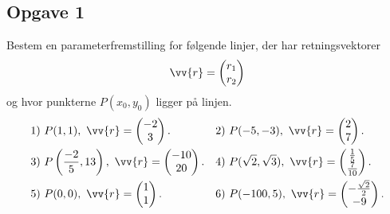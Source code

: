 \subsection*{Opgave 1}
Bestem en parameterfremstilling for følgende linjer, der har retningsvektorer $$\vv{r} = \begin{pmatrix}
r_1 \\ r_2
\end{pmatrix}$$ og hvor punkterne $P(x_0,y_0)$ ligger på linjen.
\begin{align*}
&1) \ P(1,1), \ \vv{r} = \begin{pmatrix}
-2 \\ 3
\end{pmatrix}.   &&2) \ P(-5,-3), \ \vv{r} = \begin{pmatrix}
2 \\ 7
\end{pmatrix}.    \\
&3) \ P\left(\frac{-2}{5},13\right), \ \vv{r} = \begin{pmatrix}
-10 \\ 20
\end{pmatrix}.   &&4) \ P(\sqrt{2},\sqrt{3}), \ \vv{r} = \begin{pmatrix}
\frac{1}{5} \\ \frac{7}{10}
\end{pmatrix}.   \\
&5) \ P(0,0), \ \vv{r} = \begin{pmatrix}
1 \\ 1
\end{pmatrix}.   &&6) \ P(-100,5), \ \vv{r} = \begin{pmatrix}
-\frac{\sqrt{2}}{2} \\ -9
\end{pmatrix}.   \\
\end{align*}


